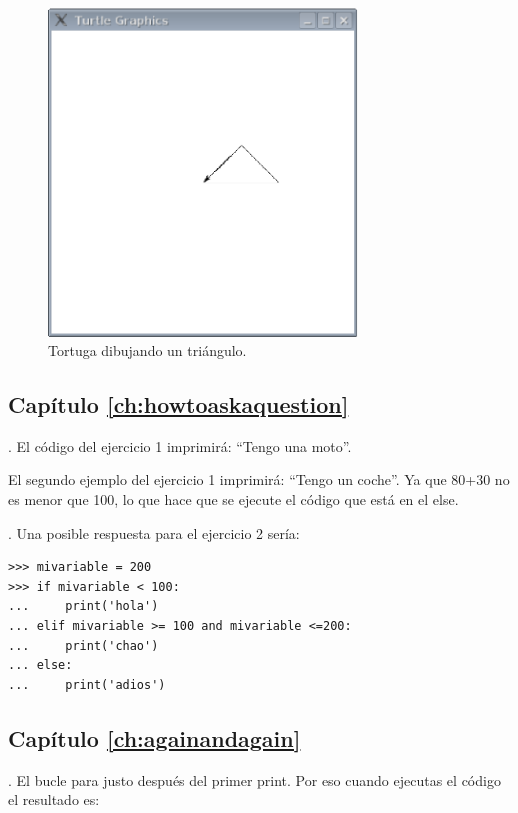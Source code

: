 \begin{figure}
\begin{center}
\includegraphics[width=82mm]{figure47.eps}
\end{center}
\caption{Tortuga dibujando un triángulo.}\label{fig47}
\end{figure}

\subsection*{Capítulo \ref{ch:howtoaskaquestion}}

.  El código del ejercicio 1 imprimirá: ``Tengo una moto''.

\noindent
El segundo ejemplo del ejercicio 1 imprimirá: ``Tengo un coche''. Ya que 80+30 no es menor que 100, lo que hace que se ejecute el código que está en el else.

.  Una posible respuesta para el ejercicio 2 sería:

\begin{listing}
\begin{verbatim}
>>> mivariable = 200
>>> if mivariable < 100:
...     print('hola')
... elif mivariable >= 100 and mivariable <=200:
...     print('chao')
... else:
...     print('adios')
\end{verbatim}
\end{listing}

\subsection*{Capítulo \ref{ch:againandagain}}

. El bucle para justo después del primer print.   Por eso cuando ejecutas el código el resultado es:

